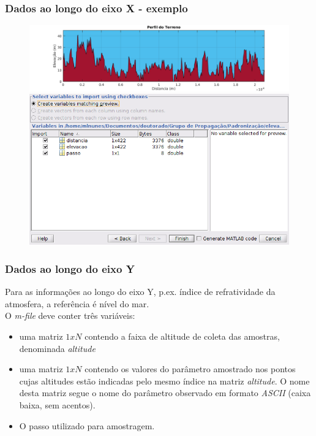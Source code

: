 \documentclass[11pt]{beamer}
\begin{document}
\begin{frame}
	\frametitle{Dados ao longo do eixo X - exemplo}
		\begin{figure}
		\includegraphics[scale=0.3]{exemplo_elevacao_grafico}
		\includegraphics[scale=0.3]{exemplo_elevacao}
	\end{figure}
\end{frame}

\begin{frame}
	\frametitle{Dados ao longo do eixo Y}
	Para as informações ao longo do eixo Y, p.ex. índice de refratividade da atmosfera, a referência é nível do mar.\\
	O \textit{m-file} deve conter três variáveis: 
	\begin{itemize}
		\item uma matriz $1xN$ contendo a faixa de altitude de coleta das amostras, denominada \emph{altitude}
		\item uma matriz $1xN$ contendo os valores do parâmetro amostrado nos pontos cujas altitudes estão indicadas pelo mesmo índice na matriz \emph{altitude}. O nome desta matriz segue o nome do parâmetro observado em formato \textit{ASCII} (caixa baixa, sem acentos).
		\item O passo utilizado para amostragem.
	\end{itemize}

\end{frame}
\end{document}
